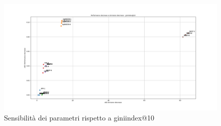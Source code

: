 \begin{figure}[H]
    \includegraphics[width=\textwidth]{images/sensibility_giniindex@10.png}
    \caption{Sensibilità dei parametri rispetto a giniindex@10}
\end{figure}

